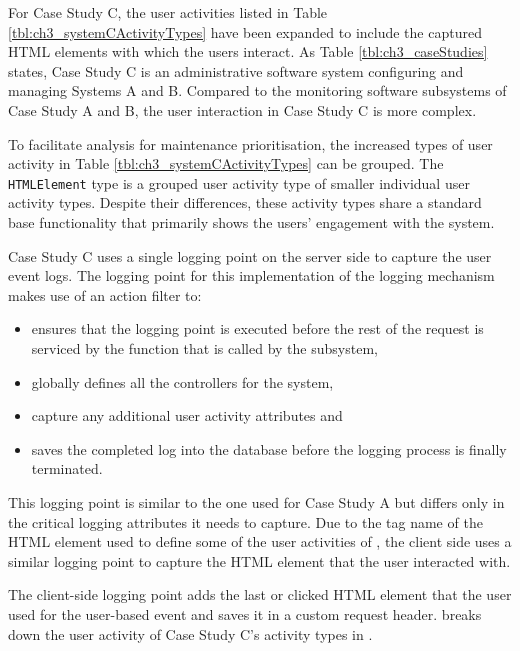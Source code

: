 For Case Study C, the user activities listed in Table \ref{tbl:ch3_systemCActivityTypes} have been expanded to include the captured HTML elements with which the users interact. As Table \ref{tbl:ch3_caseStudies} states, Case Study C is an administrative software system configuring and managing Systems A and B. Compared to the monitoring software subsystems of Case Study A and B, the user interaction in Case Study C is more complex. \par To facilitate analysis for maintenance prioritisation, the increased types of user activity in Table \ref{tbl:ch3_systemCActivityTypes} can be grouped. The \texttt{HTMLElement} type is a grouped user activity type of smaller individual user activity types. Despite their differences, these activity types share a standard base functionality that primarily shows the users' engagement with the system.\par Case Study C uses a single logging point on the server side to capture the user event logs. The logging point for this implementation of the logging mechanism makes use of an action filter to:

\begin{itemize}
	\item ensures that the logging point is executed before the rest of the request is serviced by the function that is called by the subsystem,
	\item globally defines all the controllers for the system,
	\item capture any additional user activity attributes and
	\item saves the completed log into the database before the logging process is finally terminated.
\end{itemize}

This logging point is similar to the one used for Case Study A but differs only in the critical logging attributes it needs to capture. Due to the tag name of the HTML element used to define some of the user activities of , the client side uses a similar logging point to capture the HTML element that the user interacted with.\par The client-side logging point adds the last or clicked HTML element that the user used for the user-based event and saves it in a custom request header.  breaks down the user activity of Case Study C's activity types in .

